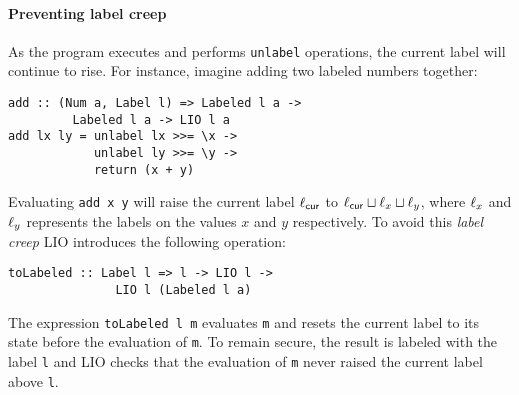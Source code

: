 \paragraph{Preventing label creep}
As the program executes and performs \texttt{unlabel} operations, the current label will continue to rise. For instance, imagine adding two labeled numbers together:
\begin{verbatim}
add :: (Num a, Label l) => Labeled l a ->
         Labeled l a -> LIO l a
add lx ly = unlabel lx >>= \x ->
            unlabel ly >>= \y ->
            return (x + y)
\end{verbatim}
Evaluating \texttt{add x y} will raise the current label $\ell_{\mathsf{cur}}$ to $\ell_{\mathsf{cur}} \sqcup \ell_x \sqcup \ell_y$, where $\ell_x$ and $\ell_y$ represents the labels on the values $x$ and $y$ respectively. To avoid this \emph{label creep} LIO introduces the following operation:
\begin{verbatim}
toLabeled :: Label l => l -> LIO l ->
               LIO l (Labeled l a)
\end{verbatim}
The expression \texttt{toLabeled l m} evaluates \texttt{m} and resets the current label to its state before the evaluation of \texttt{m}. To remain secure, the result is labeled with the label \texttt{l} and LIO checks that the evaluation of \texttt{m} never raised the current label above \texttt{l}.